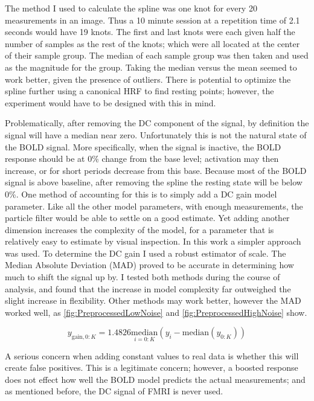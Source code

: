 The method I used to calculate the spline was one knot for every 20
measurements in an image. Thus a 10 minute session at a repetition time of
2.1 seconds would have 19 knots. The first and last knots were each
given half the number of samples as the rest of the knots; which were all
located at the center of their sample group. The median of each sample group
was then taken and used as the magnitude for the group. Taking the median
versus the mean seemed to work better, given the presence of outliers.
There is potential to optimize the spline further using a canonical
HRF to find resting points; however, the experiment would have
to be designed with this in mind.

Problematically, after removing the DC component of the signal,
by definition the signal will have a median near zero.
Unfortunately this is not the natural state of the BOLD signal. More specifically,
when the signal is inactive, the BOLD response should be at 0\% change from
the base level; activation may then increase, or for short periods decrease from this base.
Because most of the BOLD signal is above baseline, after removing the spline
the resting state will be below 0\%.
One method of accounting for this is to simply add a DC gain model parameter.
Like all the other model parameters, with enough measurements, the particle filter
would be able to settle on a good estimate. Yet adding another dimension increases the
complexity of the model, for a parameter that is relatively easy to estimate
by visual inspection.  In this work a simpler approach was used. To determine
the DC gain I used a robust estimator of scale. The Median Absolute Deviation (MAD)
proved to be accurate in determining how much to shift the signal up
by. I tested both methods during the course of analysis, and found that the increase
in model complexity far outweighed the slight increase in flexibility. Other
methods may work better, however the MAD worked well,
as \autoref{fig:PreprocessedLowNoise} and \autoref{fig:PreprocessedHighNoise} show.

\begin{equation}
y_{\text{gain}, 0:K} = 1.4826\underset{i=0:K}{\text{median}}(y_i - \text{median}(y_{0:K}))
\label{eq:mad}
\end{equation}

A serious concern when adding constant values to
real data is whether this will create false positives. This is a legitimate
concern; however, a boosted response does not effect how well the BOLD model
predicts the actual measurements; and as mentioned before, the DC signal of FMRI
is never used.

